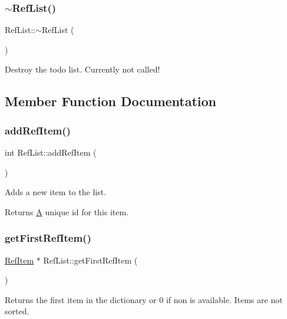 \subsubsection{\texorpdfstring{$\sim$RefList()}{~RefList()}}
{\footnotesize\ttfamily Ref\+List\+::$\sim$\+Ref\+List (\begin{DoxyParamCaption}{ }\end{DoxyParamCaption})}

Destroy the todo list. Currently not called! 

\subsection{Member Function Documentation}
\mbox{\label{class_ref_list_ae3dccd8cef3a09ed34c6fb611766875b}} 
\subsubsection{\texorpdfstring{addRefItem()}{addRefItem()}}
{\footnotesize\ttfamily int Ref\+List\+::add\+Ref\+Item (\begin{DoxyParamCaption}{ }\end{DoxyParamCaption})}

Adds a new item to the list. \begin{DoxyReturn}{Returns}
\mbox{\hyperlink{class_a}{A}} unique id for this item. 
\end{DoxyReturn}
\mbox{\label{class_ref_list_a065a043b7798849b1b97734b39ff3e85}} 
\subsubsection{\texorpdfstring{getFirstRefItem()}{getFirstRefItem()}}
{\footnotesize\ttfamily \mbox{\hyperlink{struct_ref_item}{Ref\+Item}} $\ast$ Ref\+List\+::get\+First\+Ref\+Item (\begin{DoxyParamCaption}{ }\end{DoxyParamCaption})}

Returns the first item in the dictionary or 0 if non is available. Items are not sorted. \mbox{\label{class_ref_list_a29659cc06bbde1e0b3a2b968ae333927}} 

